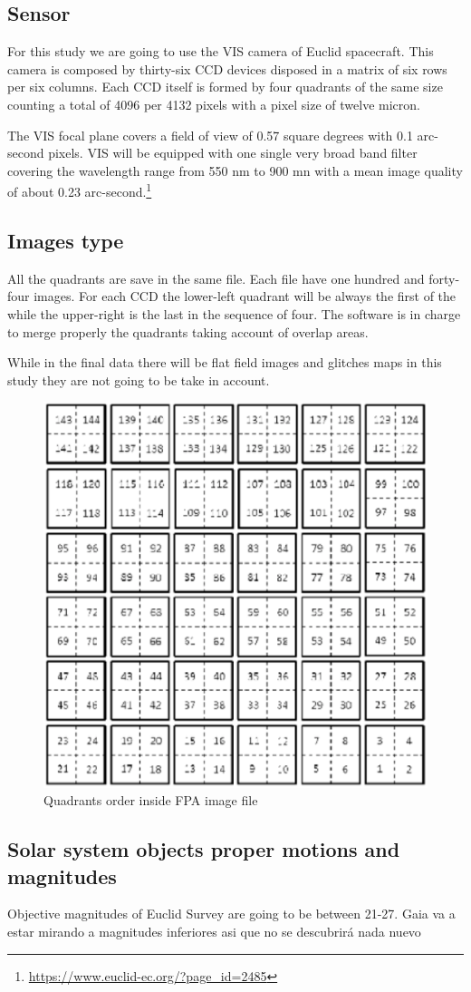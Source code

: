 \documentclass{article}
\begin{document}
\subsection{Sensor}
For this study we are going to use the VIS camera of Euclid spacecraft. This camera is composed by thirty-six CCD devices disposed in a matrix of six rows per six columns. Each CCD itself is formed by four quadrants of the same size counting a total of 4096 per 4132 pixels with a pixel size of twelve micron.
\par The VIS focal plane covers a field of view of 0.57 square degrees with 0.1 arc-second pixels. VIS will be equipped with one single very broad band filter covering the wavelength range from 550 nm to 900 mn with a mean image quality of about 0.23 arc-second.\footnote{\url{https://www.euclid-ec.org/?page_id=2485}}

\subsection{Images type}
All the quadrants are save in the same file. Each file have one hundred and forty-four images. For each CCD the lower-left quadrant will be always the first of the while the upper-right is the last in the sequence of four. The software is in charge to merge properly the quadrants taking account of overlap areas.
\par While in the final data there will be flat field images and glitches maps in this study they are not going to be take in account.
\begin{figure}[H]
\centering
\includegraphics[width=.5\linewidth]{images/quadrants_order.eps}
\caption{Quadrants order inside FPA image file}
\end{figure}

\subsection{Solar system objects proper motions and magnitudes}
Objective magnitudes of Euclid Survey are going to be between 21-27. Gaia va a estar mirando a magnitudes inferiores asi que no se descubrirá nada nuevo
\end{document}
